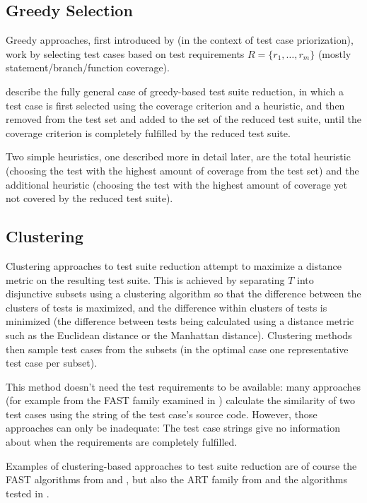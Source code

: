 \subsection{Greedy Selection}

Greedy approaches, first introduced by \cite{rothermel2001prioritizing}
(in the context of test case priorization), work by selecting test
cases based on test requirements $R=\{r_1, \dots, r_{m}\}$ (mostly
statement/branch/function coverage).

\cite{khan2018systematic} describe the fully general case of greedy-based
test suite reduction, in which a test case is first selected using
the coverage criterion and a heuristic, and then removed from the test
set and added to the set of the reduced test suite, until the coverage
criterion is completely fulfilled by the reduced test suite.

Two simple heuristics, one described more in detail later, are the total
heuristic (choosing the test with the highest amount of coverage from
the test set) and the additional heuristic (choosing the test with the
highest amount of coverage yet not covered by the reduced test suite).

\subsection{Clustering}

Clustering approaches to test suite reduction attempt to maximize
a distance metric on the resulting test suite. This is achieved by
separating $T$ into disjunctive subsets using a clustering algorithm so
that the difference between the clusters of tests is maximized, and the
difference within clusters of tests is minimized (the difference between
tests being calculated using a distance metric such as the Euclidean
distance or the Manhattan distance). Clustering methods then sample
test cases from the subsets (in the optimal case one representative test
case per subset).

This method doesn't need the test requirements to be available:
many approaches (for example from the FAST family examined in
\cite{miranda2018fast}) calculate the similarity of two test cases using
the string of the test case's source code. However, those approaches can
only be inadequate: The test case strings give no information about when
the requirements are completely fulfilled.

Examples of clustering-based approaches to test suite reduction are
of course the FAST algorithms from \cite{cruciani2019scalable}
and \cite{miranda2018fast}, but also the ART family from
\cite{chen2010adaptive} and the algorithms tested in
\cite{hemmati2010achieving}.

